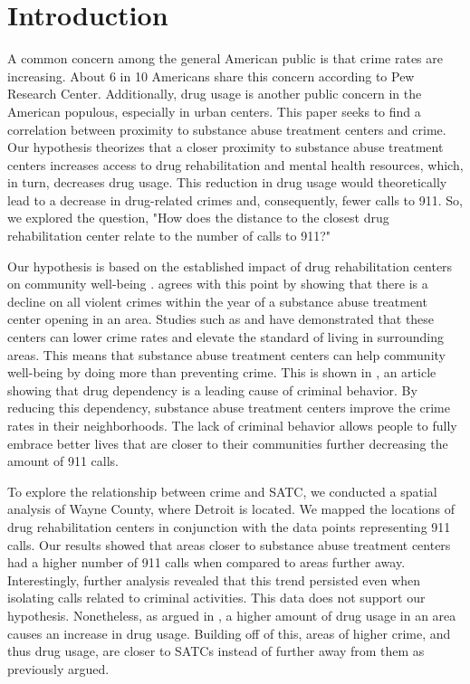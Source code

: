 \documentclass[12pt]{article}
\begin{document}
\bigskip
\section{Introduction} \label{sec:introduction}
  A common concern among the general American public is that crime rates are increasing. About 6 in 10 Americans share this concern according to Pew Research Center. Additionally, drug usage is another public concern in the American populous, especially in urban centers. This paper seeks to find a correlation between proximity to  substance abuse treatment centers and crime. Our hypothesis theorizes that a closer proximity to substance abuse treatment centers increases access to drug rehabilitation and mental health resources, which, in turn, decreases drug usage. This reduction in drug usage would theoretically lead to a decrease in drug-related crimes and, consequently, fewer calls to 911. So, we explored the question, "How does the distance to the closest drug rehabilitation center relate to the number of calls to 911?" 

Our hypothesis is based on the established impact of drug rehabilitation centers on community well-being . \cite{SAT_centers_and_crime} agrees with this point by showing that there is a decline on all violent crimes within the year of a substance abuse treatment center opening in an area.  Studies such as \cite{drugs_and_crime} and \cite{drugs_crime_space_time} have demonstrated that these centers can lower crime rates and elevate the standard of living in surrounding areas. This means that substance abuse treatment centers can help community well-being by doing more than preventing crime. This is shown in \cite{mental_healthcare_and_crime}, an article showing that drug dependency is a leading cause of criminal behavior. By reducing this dependency, substance abuse treatment centers improve the crime rates in their neighborhoods. The lack of criminal behavior allows people to fully embrace better lives that are closer to their communities further decreasing the amount of 911 calls. 

To explore the relationship between crime and SATC, we conducted a spatial analysis of Wayne County, where Detroit is located. We mapped the locations of drug rehabilitation centers in conjunction with the data points representing 911 calls. Our results showed that areas closer to substance abuse treatment centers had a higher number of 911 calls when compared to areas further away.  Interestingly, further analysis revealed that this trend persisted even when isolating calls related to criminal activities. This data does not support our hypothesis. Nonetheless, as argued in \cite{Socioeconomic-Determinants}, a higher amount of drug usage in an area causes an increase in drug usage. Building off of this, areas of higher crime, and thus drug usage, are closer to SATCs instead of further away from them as previously argued. 
\end{document}
